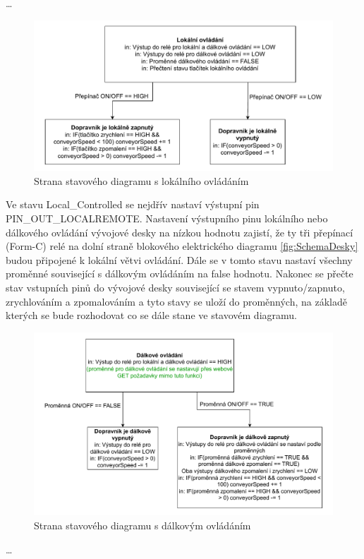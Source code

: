 \dots
\begin{figure}[H]
    \centering
    \includegraphics[width=1\linewidth]{images/StateFlow_Firmwaru_left.drawio.pdf}
    \caption{Strana stavového diagramu s lokálního ovládáním}
    \label{fig:StateFlow_Firmwaru_left}
\end{figure}

Ve stavu Local\_Controlled se nejdřív nastaví výstupní pin PIN\_OUT\_LOCALREMOTE. Nastavení výstupního pinu lokálního nebo dálkového ovládání vývojové desky na nízkou hodnotu zajistí, že ty tři přepínací (Form-C) relé na dolní straně blokového elektrického diagramu \ref{fig:SchemaDesky} budou připojené k lokální větvi ovládání. Dále se v tomto stavu nastaví všechny proměnné související s dálkovým ovládáním na false hodnotu. Nakonec se přečte stav vstupních pinů do vývojové desky související se stavem vypnuto/zapnuto, zrychlováním a zpomalováním a tyto stavy se uloží do proměnných, na základě kterých se bude rozhodovat co se dále stane ve stavovém diagramu.



\begin{figure}[H]
    \centering
    \includegraphics[width=1\linewidth]{images/StateFlow_Firmwaru_right.drawio.pdf}
    \caption{Strana stavového diagramu s dálkovým ovládáním}
    \label{fig:StateFlow_Firmwaru_right}
\end{figure}
\dots

